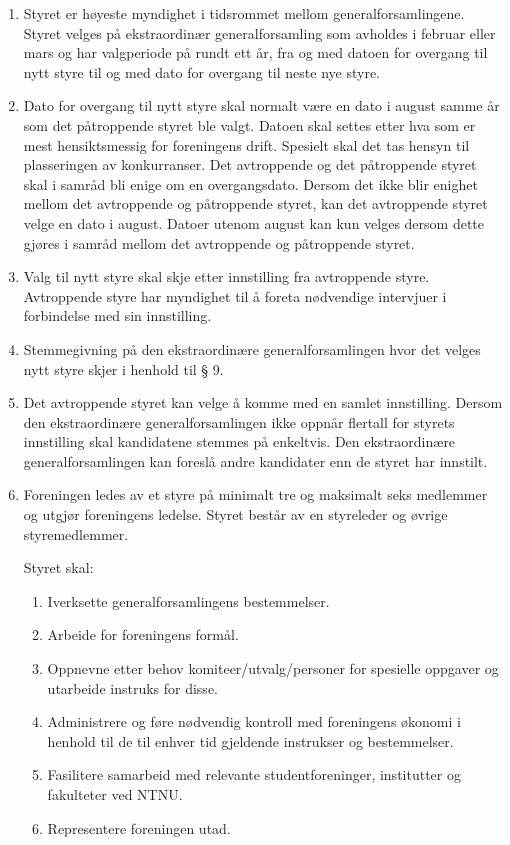\documentclass[a4paper,11pt,titlepage]{article}
\begin{document}
\begin{enumerate}

\item Styret er høyeste myndighet i tidsrommet mellom generalforsamlingene. Styret velges på ekstraordinær generalforsamling som avholdes i februar eller mars og har valgperiode på rundt ett år, fra og med datoen for overgang til nytt styre til og med dato for overgang til neste nye styre. 

\item Dato for overgang til nytt styre skal normalt være en dato i august samme år som det påtroppende styret ble valgt. Datoen skal settes etter hva som er mest hensiktsmessig for foreningens drift. Spesielt skal det tas hensyn til plasseringen av konkurranser. Det avtroppende og det påtroppende styret skal i samråd bli enige om en overgangsdato. Dersom det ikke blir enighet mellom det avtroppende og påtroppende styret, kan det avtroppende styret velge en dato i august. Datoer utenom august kan kun velges dersom dette gjøres i samråd mellom det avtroppende og påtroppende styret.

\item Valg til nytt styre skal skje etter innstilling fra avtroppende styre. Avtroppende styre har myndighet til å foreta nødvendige intervjuer i forbindelse med sin innstilling.

\item Stemmegivning på den ekstraordinære generalforsamlingen hvor det velges nytt styre skjer i henhold til § 9.

\item Det avtroppende styret kan velge å komme med en samlet innstilling. Dersom den ekstraordinære generalforsamlingen ikke oppnår flertall for styrets innstilling skal kandidatene stemmes på enkeltvis. Den ekstraordinære generalforsamlingen kan foreslå andre kandidater enn de styret har innstilt.

\item Foreningen ledes av et styre på minimalt tre og maksimalt seks medlemmer og utgjør foreningens ledelse. Styret består av en styreleder og øvrige styremedlemmer. 

Styret skal:
\begin{enumerate}
\item Iverksette generalforsamlingens bestemmelser.
\item Arbeide for foreningens formål.
\item Oppnevne etter behov komiteer/utvalg/personer for spesielle oppgaver og utarbeide instruks for disse.
\item Administrere og føre nødvendig kontroll med foreningens økonomi i henhold til de til enhver tid gjeldende instrukser og bestemmelser.
\item Fasilitere samarbeid med relevante studentforeninger, institutter og fakulteter ved NTNU.
\item Representere foreningen utad.
\end{enumerate}


\end{enumerate}
\end{document}
